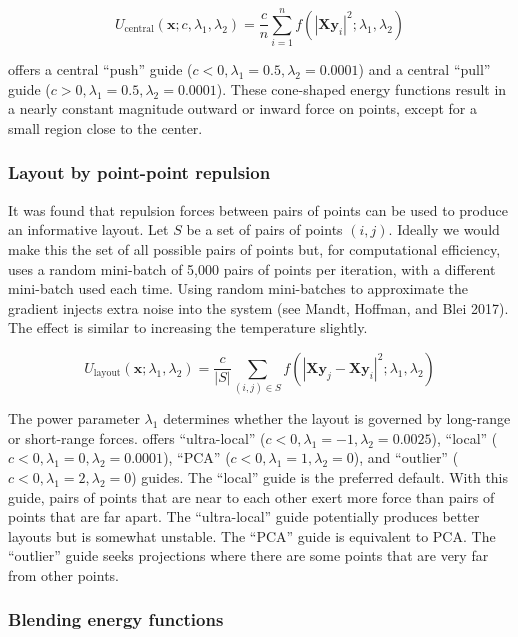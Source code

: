 \[
U_\text{central}(\mathbf x ; c,\lambda_1,\lambda_2) = \frac{c}{n} \sum_{i=1}^n f\left(|\mathbf X \mathbf y_{i}|^2 ; \lambda_1,\lambda_2\right)
\]

 offers a central ``push'' guide (\(c<0,\lambda_1=0.5,\lambda_2=0.0001\)) and a central ``pull'' guide (\(c>0,\lambda_1=0.5,\lambda_2=0.0001\)). These cone-shaped energy functions result in a nearly constant magnitude outward or inward force on points, except for a small region close to the center.

\hypertarget{layout-by-point-point-repulsion}{%
\subsubsection{Layout by point-point repulsion}\label{layout-by-point-point-repulsion}}

It was found that repulsion forces between pairs of points can be used to produce an informative layout. Let \(S\) be a set of pairs of points \((i,j)\). Ideally we would make this the set of all possible pairs of points but, for computational efficiency,  uses a random mini-batch of 5,000 pairs of points per iteration, with a different mini-batch used each time. Using random mini-batches to approximate the gradient injects extra noise into the system (see Mandt, Hoffman, and Blei 2017). The effect is similar to increasing the temperature slightly.

\[
U_\text{layout}(\mathbf x ; \lambda_1,\lambda_2) = 
    \frac{c}{|S|} \sum_{(i,j) \in S} f\left(|\mathbf X \mathbf y_{j}-\mathbf X \mathbf y_{i}|^2; \lambda_1,\lambda_2\right)
\]

The power parameter \(\lambda_1\) determines whether the layout is governed by long-range or short-range forces.  offers ``ultra-local'' (\(c<0,\lambda_1=-1,\lambda_2=0.0025\)), ``local'' (\(c<0,\lambda_1=0,\lambda_2=0.0001\)), ``PCA'' (\(c<0,\lambda_1=1,\lambda_2=0\)), and ``outlier'' (\(c<0,\lambda_1=2,\lambda_2=0\)) guides. The ``local'' guide is the preferred default. With this guide, pairs of points that are near to each other exert more force than pairs of points that are far apart. The ``ultra-local'' guide potentially produces better layouts but is somewhat unstable. The ``PCA'' guide is equivalent to PCA. The ``outlier'' guide seeks projections where there are some points that are very far from other points.

\hypertarget{blending-energy-functions}{%
\subsubsection{Blending energy functions}\label{blending-energy-functions}}

